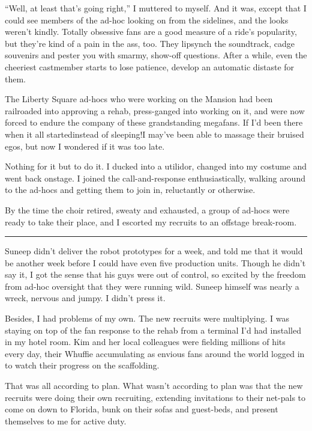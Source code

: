 “Well, at least that's going right,” I muttered to myself. And it
was, except that I could see members of the ad-hoc looking on from
the sidelines, and the looks weren't kindly. Totally obsessive fans
are a good measure of a ride's popularity, but they're kind of a
pain in the ass, too. They lipsynch the soundtrack, cadge souvenirs
and pester you with smarmy, show-off questions. After a while, even
the cheeriest castmember starts to lose patience, develop an
automatic distaste for them.

The Liberty Square ad-hocs who were working on the Mansion had been
railroaded into approving a rehab, press-ganged into working on it,
and were now forced to endure the company of these grandstanding
megafans. If I'd been there when it all started{\dash}instead of
sleeping!{\dash}I may've been able to massage their bruised egos, but now
I wondered if it was too late.

Nothing for it but to do it. I ducked into a utilidor, changed into
my costume and went back onstage. I joined the call-and-response
enthusiastically, walking around to the ad-hocs and getting them to
join in, reluctantly or otherwise.

By the time the choir retired, sweaty and exhausted, a group of
ad-hocs were ready to take their place, and I escorted my recruits
to an offstage break-room.

\begin{center}\rule{3in}{0.4pt}\end{center}

Suneep didn't deliver the robot prototypes for a week, and told me
that it would be another week before I could have even five
production units. Though he didn't say it, I got the sense that his
guys were out of control, so excited by the freedom from ad-hoc
oversight that they were running wild. Suneep himself was nearly a
wreck, nervous and jumpy. I didn't press it.

Besides, I had problems of my own. The new recruits were
multiplying. I was staying on top of the fan response to the rehab
from a terminal I'd had installed in my hotel room. Kim and her
local colleagues were fielding millions of hits every day, their
Whuffie accumulating as envious fans around the world logged in to
watch their progress on the scaffolding.

That was all according to plan. What wasn't according to plan was
that the new recruits were doing their own recruiting, extending
invitations to their net-pals to come on down to Florida, bunk on
their sofas and guest-beds, and present themselves to me for active
duty.

